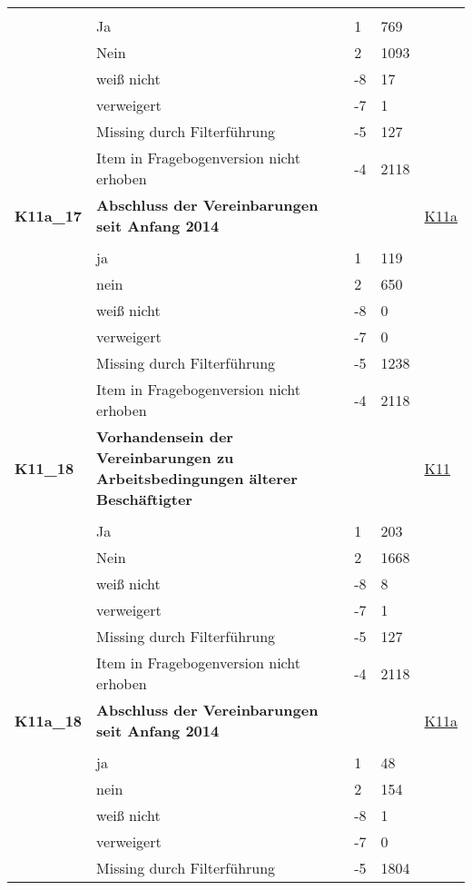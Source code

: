 \begin{longtable}{| L{2.5cm} | L{8.25cm}| C{1.5cm} | R{1.25cm} | C{2.25cm} |  }
   &  &  &  &  \\ 
   & Ja & 1 & 769 &  \\ 
   & Nein & 2 & 1093 &  \\ 
   & weiß nicht & -8 & 17 &  \\ 
   & verweigert & -7 & 1 &  \\ 
   & Missing durch Filterführung & -5 & 127 &  \\ 
   & Item in Fragebogenversion nicht erhoben & -4 & 2118 &  \\ 
   \midrule
\textbf{K11a\_17}\label{var:suf:K11a:17} & \textbf{Abschluss der Vereinbarungen seit Anfang 2014} &  &  & \hyperref[K11a]{K11a} \\ 
   &  &  &  &  \\ 
   & ja & 1 & 119 &  \\ 
   & nein & 2 & 650 &  \\ 
   & weiß nicht & -8 & 0 &  \\ 
   & verweigert & -7 & 0 &  \\ 
   & Missing durch Filterführung & -5 & 1238 &  \\ 
   & Item in Fragebogenversion nicht erhoben & -4 & 2118 &  \\ 
   \midrule
\textbf{K11\_18}\label{var:suf:K11:18} & \textbf{Vorhandensein der Vereinbarungen zu Arbeitsbedingungen älterer Beschäftigter} &  &  & \hyperref[K11]{K11} \\ 
   &  &  &  &  \\ 
   & Ja & 1 & 203 &  \\ 
   & Nein & 2 & 1668 &  \\ 
   & weiß nicht & -8 & 8 &  \\ 
   & verweigert & -7 & 1 &  \\ 
   & Missing durch Filterführung & -5 & 127 &  \\ 
   & Item in Fragebogenversion nicht erhoben & -4 & 2118 &  \\ 
   \midrule
\textbf{K11a\_18}\label{var:suf:K11a:18} & \textbf{Abschluss der Vereinbarungen seit Anfang 2014} &  &  & \hyperref[K11a]{K11a} \\ 
   &  &  &  &  \\ 
   & ja & 1 & 48 &  \\ 
   & nein & 2 & 154 &  \\ 
   & weiß nicht & -8 & 1 &  \\ 
   & verweigert & -7 & 0 &  \\ 
   & Missing durch Filterführung & -5 & 1804 &  \\ 

\end{longtable}
